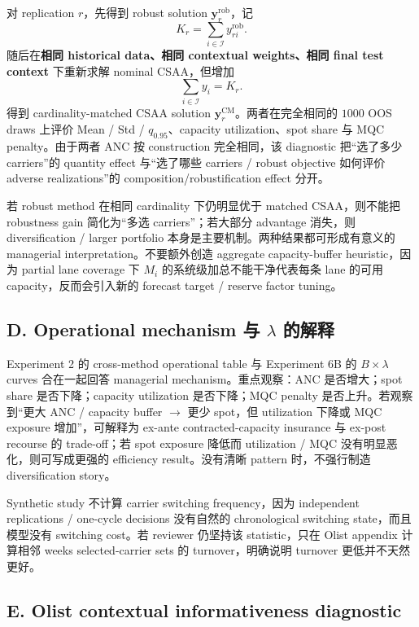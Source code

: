 \documentclass[11pt,a4paper]{ctexart}
\newcommand{\I}{\mathcal I}
\begin{document}
对 replication $r$，先得到 robust solution $\boldsymbol y_r^{\mathrm{rob}}$，记
\[
K_r=\sum_{i\in\I}y_{ri}^{\mathrm{rob}}.
\]
随后在\textbf{相同 historical data、相同 contextual weights、相同 final test context} 下重新求解 nominal CSAA，但增加
\[
\sum_{i\in\I}y_i=K_r.
\]
得到 cardinality-matched CSAA solution $\boldsymbol y_r^{\mathrm{CM}}$。两者在完全相同的 $1000$ OOS draws 上评价 Mean / Std / $q_{0.95}$、capacity utilization、spot share 与 MQC penalty。由于两者 ANC 按 construction 完全相同，该 diagnostic 把“选了多少 carriers”的 quantity effect 与“选了哪些 carriers / robust objective 如何评价 adverse realizations”的 composition/robustification effect 分开。

若 robust method 在相同 cardinality 下仍明显优于 matched CSAA，则不能把 robustness gain 简化为“多选 carriers”；若大部分 advantage 消失，则 diversification / larger portfolio 本身是主要机制。两种结果都可形成有意义的 managerial interpretation。不要额外创造 aggregate capacity-buffer heuristic，因为 partial lane coverage 下 $M_i$ 的系统级加总不能干净代表每条 lane 的可用 capacity，反而会引入新的 forecast target / reserve factor tuning。

\subsection{D. Operational mechanism 与 $\lambda$ 的解释}

Experiment 2 的 cross-method operational table 与 Experiment 6B 的 $B\times\lambda$ curves 合在一起回答 managerial mechanism。重点观察：ANC 是否增大；spot share 是否下降；capacity utilization 是否下降；MQC penalty 是否上升。若观察到“更大 ANC / capacity buffer $\rightarrow$ 更少 spot，但 utilization 下降或 MQC exposure 增加”，可解释为 ex-ante contracted-capacity insurance 与 ex-post recourse 的 trade-off；若 spot exposure 降低而 utilization / MQC 没有明显恶化，则可写成更强的 efficiency result。没有清晰 pattern 时，不强行制造 diversification story。

Synthetic study 不计算 carrier switching frequency，因为 independent replications / one-cycle decisions 没有自然的 chronological switching state，而且模型没有 switching cost。若 reviewer 仍坚持该 statistic，只在 Olist appendix 计算相邻 weeks selected-carrier sets 的 turnover，明确说明 turnover 更低并不天然更好。

\subsection{E. Olist contextual informativeness diagnostic}
\end{document}
